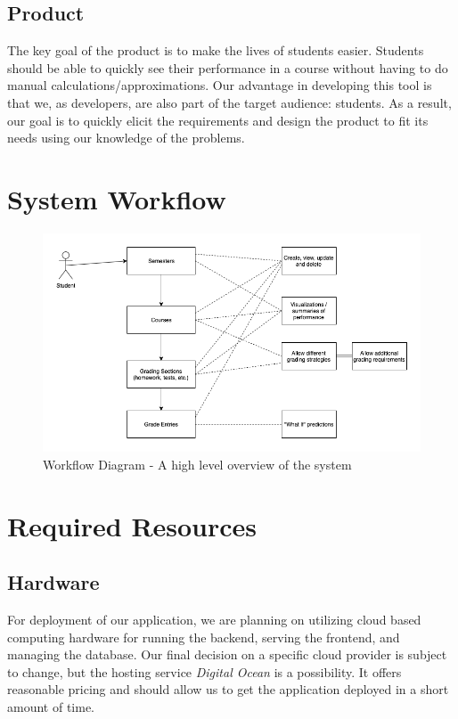 \documentclass[12pt]{article}
\begin{document}
\subsection{Product}
The key goal of the product is to make the lives of students easier. Students should be able to
quickly see their performance in a course without having to do manual calculations/approximations.
Our advantage in developing this tool is that we, as developers, are also part of the target
audience: students. As a result, our goal is to quickly elicit the requirements and design the
product to fit its needs using our knowledge of the problems.

\section{System Workflow}
\begin{figure}[H]
  \centering
  \includegraphics[width=\linewidth]{resources/workflow_diagram.png}
  \caption{Workflow Diagram - A high level overview of the system}
\end{figure}

\section{Required Resources}
\subsection{Hardware}
For deployment of our application, we are planning on utilizing cloud based computing hardware for
running the backend, serving the frontend, and managing the database. Our final decision on a
specific cloud provider is subject to change, but the hosting service \textit{Digital Ocean} is a
possibility. It offers reasonable pricing and should allow us to get the application deployed in a
short amount of time.
\end{document}
